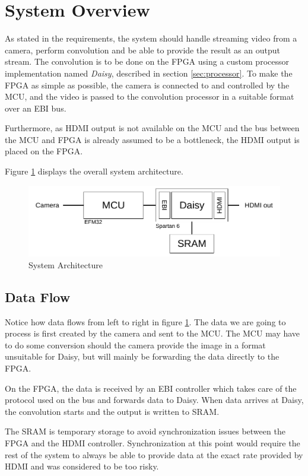 \section{System Overview}
As stated in the requirements, the system should handle streaming video from a camera, perform convolution and be able to provide the result as an output stream.
The convolution is to be done on the FPGA using a custom processor implementation named \textit{Daisy}, described in section \ref{sec:processor}.
To make the FPGA as simple as possible, the camera is connected to and controlled by the MCU, and the video is passed to the convolution processor in a suitable format over an EBI bus.

Furthermore, as HDMI output is not available on the MCU and the bus between the MCU and FPGA is already assumed to be a bottleneck, the HDMI output is placed on the FPGA.

Figure \ref{fig:systemArchitecture} displays the overall system architecture.

\begin{figure}
    \includegraphics{img/SystemArchitecture.pdf}
    \caption{System Architecture}
    \label{fig:systemArchitecture}
\end{figure}



\subsection{Data Flow}
Notice how data flows from left to right in figure \ref{fig:systemArchitecture}.
The data we are going to process is first created by the camera and sent to the MCU.
The MCU may have to do some conversion should the camera provide the image in a format unsuitable for Daisy, but will mainly be forwarding the data directly to the FPGA.

On the FPGA, the data is received by an EBI controller which takes care of the protocol used on the bus and forwards data to Daisy.
When data arrives at Daisy, the convolution starts and the output is written to SRAM.

The SRAM is temporary storage to avoid synchronization issues between the FPGA and the HDMI controller.
Synchronization at this point would require the rest of the system to always be able to provide data at the exact rate provided by HDMI and was considered to be too risky.


